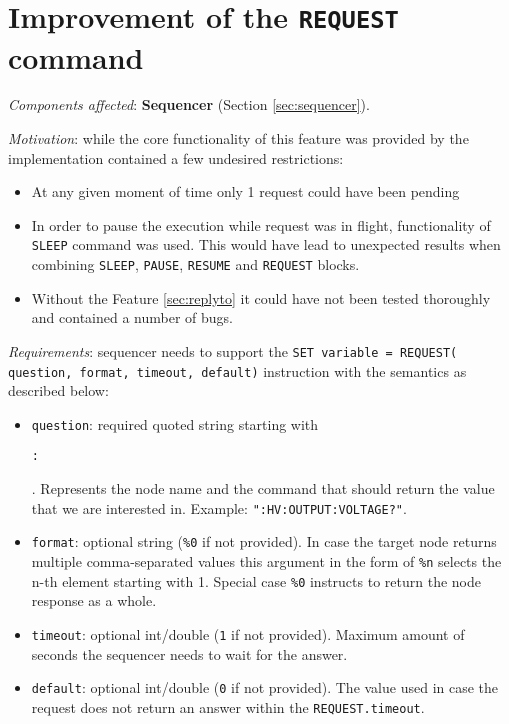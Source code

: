 \section{Improvement of the \texttt{REQUEST} command}
\label{sec:request}

\textit{Components affected}: \textbf{Sequencer} (Section \ref{sec:sequencer}).

\textit{Motivation}: while the core functionality of this feature was provided by \cite{Germann2019} the implementation contained a few undesired restrictions:

\begin{itemize}
	\item At any given moment of time only 1 request could have been pending
	\item In order to pause the execution while request was in flight, functionality of \texttt{SLEEP} command was used. This would have lead to unexpected results when combining \texttt{SLEEP}, \texttt{PAUSE}, \texttt{RESUME} and \texttt{REQUEST} blocks.
	\item Without the Feature \ref{sec:replyto} it could have not been tested thoroughly and contained a number of bugs.
\end{itemize}

\textit{Requirements}: sequencer needs to support the \texttt{SET variable = REQUEST( question, format, timeout, default)} instruction with the semantics as described below:

\begin{itemize}
	\item \texttt{question}: required quoted string starting with \colorbox{selectioncolor}{\strut \texttt{:}}. Represents the node name and the  command that should return the value that we are interested in. Example: \texttt{":HV:OUTPUT:VOLTAGE?"}.
	\item \texttt{format}: optional string (\texttt{\%0} if not provided). In case the target node returns multiple comma-separated values this argument in the form of \texttt{\%n} selects the n-th element starting with 1. Special case \texttt{\%0} instructs to return the node response as a whole.
	\item \texttt{timeout}: optional int/double (\texttt{1} if not provided). Maximum amount of seconds the sequencer needs to wait for the answer.
	\item \texttt{default}: optional int/double (\texttt{0} if not provided). The value used in case the request does not return an answer within the \texttt{REQUEST.timeout}.
\end{itemize}

